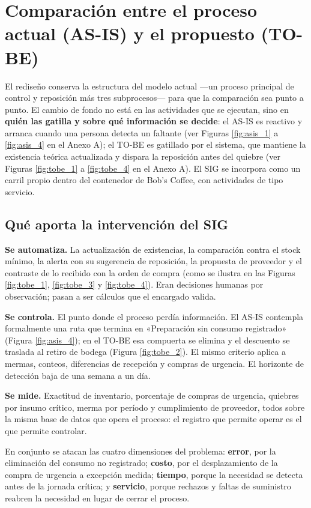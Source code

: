 \documentclass[11pt,letterpaper]{article}
\begin{document}
\newpage

\section{Comparación entre el proceso actual (AS-IS) y el propuesto (TO-BE)}

El rediseño conserva la estructura del modelo actual —un proceso principal de control y reposición más tres subprocesos— para que la comparación sea punto a punto. El cambio de fondo no está en las actividades que se ejecutan, sino en \textbf{quién las gatilla y sobre qué información se decide}: el AS-IS es reactivo y arranca cuando una persona detecta un faltante (ver Figuras \ref{fig:asis_1} a \ref{fig:asis_4} en el Anexo A); el TO-BE es gatillado por el sistema, que mantiene la existencia teórica actualizada y dispara la reposición antes del quiebre (ver Figuras \ref{fig:tobe_1} a \ref{fig:tobe_4} en el Anexo A). El SIG se incorpora como un carril propio dentro del contenedor de Bob's Coffee, con actividades de tipo servicio.


\subsection{Qué aporta la intervención del SIG}

\textbf{Se automatiza.} La actualización de existencias, la comparación contra el stock mínimo, la alerta con su sugerencia de reposición, la propuesta de proveedor y el contraste de lo recibido con la orden de compra (como se ilustra en las Figuras \ref{fig:tobe_1}, \ref{fig:tobe_3} y \ref{fig:tobe_4}). Eran decisiones humanas por observación; pasan a ser cálculos que el encargado valida.

\textbf{Se controla.} El punto donde el proceso perdía información. El AS-IS contempla formalmente una ruta que termina en «Preparación sin consumo registrado» (Figura \ref{fig:asis_4}); en el TO-BE esa compuerta se elimina y el descuento se traslada al retiro de bodega (Figura \ref{fig:tobe_2}). El mismo criterio aplica a mermas, conteos, diferencias de recepción y compras de urgencia. El horizonte de detección baja de una semana a un día.

\textbf{Se mide.} Exactitud de inventario, porcentaje de compras de urgencia, quiebres por insumo crítico, merma por período y cumplimiento de proveedor, todos sobre la misma base de datos que opera el proceso: el registro que permite operar es el que permite controlar.

En conjunto se atacan las cuatro dimensiones del problema: \textbf{error}, por la eliminación del consumo no registrado; \textbf{costo}, por el desplazamiento de la compra de urgencia a excepción medida; \textbf{tiempo}, porque la necesidad se detecta antes de la jornada crítica; y \textbf{servicio}, porque rechazos y faltas de suministro reabren la necesidad en lugar de cerrar el proceso.
\end{document}
